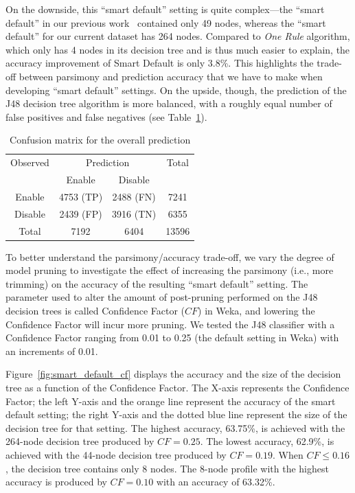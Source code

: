 On the downside, this ``smart default'' setting is quite complex---the ``smart default'' in our previous work~\cite{bahiratiui2018} contained only 49 nodes, whereas the ``smart default'' for our current dataset has 264 nodes. Compared to \textit{One Rule} algorithm, which only has 4 nodes in its decision tree and is thus much easier to explain, the accuracy improvement of Smart Default is only 3.8\%. This highlights the trade-off between parsimony and prediction accuracy that we have to make when developing ``smart default'' settings. On the upside, though, the prediction of the J48 decision tree algorithm is more balanced, with a roughly equal number of false positives and false negatives (see Table~\ref{tab:confusion_matrix2}).


\begin{table}
	\centering
	\caption{Confusion matrix for the overall prediction}
	\label{tab:confusion_matrix2}
	\begin{tabular}{c|c|c|c} \hline
		Observed &\multicolumn{2}{c|}{Prediction} & Total\\ \cline{2-3}
		& Enable     & Disable       &  \\ \hline
		Enable   & 4753 (TP) & 2488 (FN)  & 7241   \\ \hline
		Disable    & 2439 (FP)  & 3916 (TN) & 6355  \\ \hline
		Total & 7192     & 6404     & 13596  \\ \hline
	\end{tabular}
\end{table}

To better understand the parsimony/accuracy trade-off, we vary the degree of model pruning to investigate the effect of increasing the parsimony (i.e., more trimming) on the accuracy of the resulting ``smart default'' setting. The parameter used to alter the amount of post-pruning performed on the J48 decision trees is called Confidence Factor ($CF$) in Weka, and lowering the Confidence Factor will incur more pruning. We tested the J48 classifier with a Confidence Factor ranging from 0.01 to 0.25 (the default setting in Weka) with an increments of 0.01.

Figure~\ref{fig:smart_default_cf} displays the accuracy and the size of the decision tree as a function of the Confidence Factor. The X-axis represents the Confidence Factor; the left Y-axis and the orange line represent the accuracy of the smart default setting; the right Y-axis and the dotted blue line represent the size of the decision tree for that setting. The highest accuracy, 63.75\%, is achieved with the 264-node decision tree produced by $CF = 0.25$. The lowest accuracy, 62.9\%, is achieved with the 44-node decision tree produced by $CF = 0.19$. When $CF \leq 0.16$, the decision tree contains only 8 nodes. The 8-node profile with the highest accuracy is produced by $CF = 0.10$ with an accuracy of 63.32\%.

